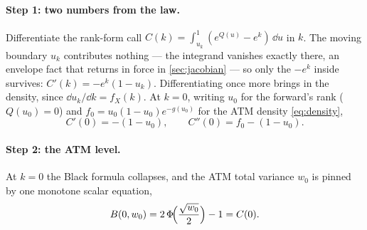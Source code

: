 \documentclass[11pt]{article}
\begin{document}
\paragraph{Step 1: two numbers from the law.}  Differentiate the rank-form
call $C(k)=\int_{u_k}^1(e^{Q(u)}-e^{k})\,\dd u$ in $k$.  The moving boundary
$u_k$ contributes nothing --- the integrand vanishes exactly there, an
envelope fact that returns in force in \cref{sec:jacobian} --- so only the
$-e^{k}$ inside survives: $C'(k)=-e^{k}(1-u_k)$.  Differentiating once more
brings in the density, since $\dd u_k/\dd k=f_X(k)$.  At $k=0$, writing
$u_0$ for the forward's rank ($Q(u_0)=0$) and
$f_0=u_0(1-u_0)e^{-g(u_0)}$ for the ATM density \eqref{eq:density},
\begin{equation}
C'(0)=-(1-u_0),
\qquad
C''(0)=f_0-(1-u_0).
\label{eq:Cder}
\end{equation}

\paragraph{Step 2: the ATM level.}  At $k=0$ the Black formula collapses,
and the ATM total variance $w_0$ is pinned by one monotone scalar equation,
\begin{equation}
B(0,w_0)=2\,\Phi\!\Big(\frac{\sqrt{w_0}}{2}\Big)-1=C(0).
\label{eq:atm_level}
\end{equation}
\end{document}
